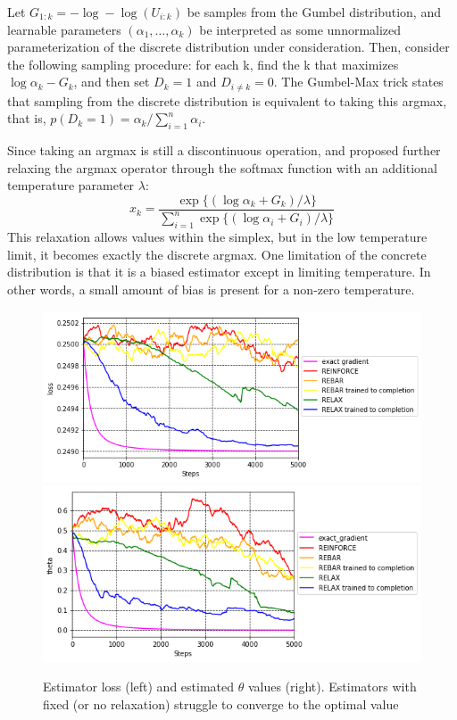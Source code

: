 \documentclass{article}
\begin{document}
Let $G_{1:k} = -\log-\log(U_{i:k})$ be samples from the Gumbel distribution, and learnable parameters $(\alpha_1, \dots, \alpha_k)$ be interpreted as some unnormalized parameterization of the discrete distribution under consideration.
Then, consider the following sampling procedure: for each k, find the k that maximizes $\log \alpha_k - G_k$, and then set $D_k=1$ and $D_{i \neq k} = 0$. The Gumbel-Max trick states that sampling from the discrete distribution is equivalent to taking this argmax, that is, $p(D_k = 1) = \alpha_k / \sum_{i=1}^n \alpha_i$.

Since taking an argmax is still a discontinuous operation, \cite{maddison2016concrete} and \cite{jang2016categorical} proposed further relaxing the argmax operator through the softmax function with an additional temperature parameter $\lambda$:
\begin{equation}
x_k = \frac{\exp\{( \log \alpha_k+ G_k) / \lambda\}}{\sum_{i=1}^n\exp\{( \log \alpha_i+ G_i) / \lambda\}}
\end{equation}
This relaxation allows values within the simplex, but in the low temperature limit, it becomes exactly the discrete argmax.
One limitation of the concrete distribution is that it is a biased estimator except in limiting temperature.
In other words, a small amount of bias is present for a non-zero temperature.



\begin{figure}
\begin{center}
\includegraphics[scale=.33]{figures/losses}
\includegraphics[scale=.33]{figures/theta}
\end{center}
\label{fig:toy_loss}
\caption{Estimator loss (left) and estimated $\theta$ values (right). Estimators with fixed (or no relaxation) struggle to converge to the optimal value}
\end{figure}
\end{document}
